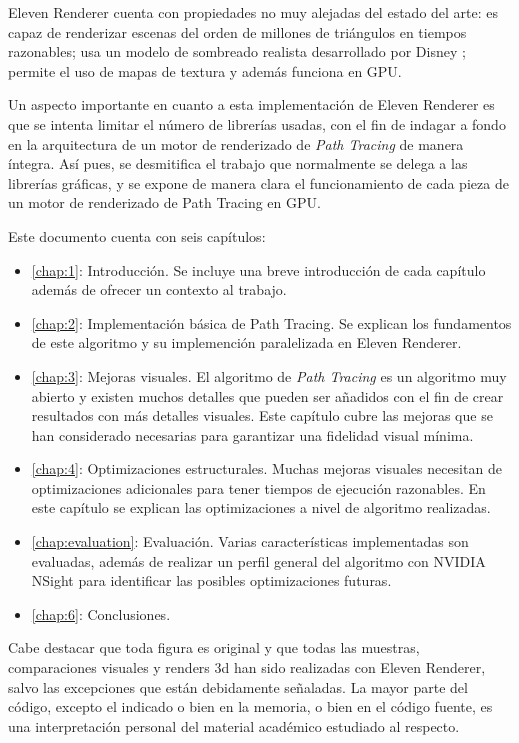 Eleven Renderer cuenta con propiedades no muy alejadas del estado del arte: es capaz de renderizar escenas del orden de millones de triángulos en tiempos razonables; usa un modelo de sombreado realista desarrollado por Disney \cite{burley2012physically}; permite el uso de mapas de textura y además funciona en GPU.

Un aspecto importante en cuanto a esta implementación de Eleven Renderer es que se intenta limitar el número de librerías usadas, con el fin de indagar a fondo en la arquitectura de un motor de renderizado de \emph{Path Tracing} de manera íntegra. Así pues, se desmitifica el trabajo que normalmente se delega a las librerías gráficas, y se expone de manera clara el funcionamiento de cada pieza de un motor de renderizado de Path Tracing en GPU.

Este documento cuenta con seis capítulos:

\begin{itemize}
	\item \autoref{chap:1}: Introducción. Se incluye una breve introducción de cada capítulo además de ofrecer un contexto al trabajo.
	\item \autoref{chap:2}: Implementación básica de Path Tracing. Se explican los fundamentos de este algoritmo y su implemención paralelizada en Eleven Renderer. 
	\item \autoref{chap:3}: Mejoras visuales. El algoritmo de \emph{Path Tracing} es un algoritmo muy abierto y existen muchos detalles que pueden ser añadidos con el fin de crear resultados con más detalles visuales. Este capítulo cubre las mejoras que se han considerado necesarias para garantizar una fidelidad visual mínima.
	\item \autoref{chap:4}: Optimizaciones estructurales. Muchas mejoras visuales necesitan de optimizaciones adicionales para tener tiempos de ejecución razonables. En este capítulo se explican las optimizaciones a nivel de algoritmo realizadas.
	\item \autoref{chap:evaluation}: Evaluación. Varias características implementadas son evaluadas, además de realizar un perfil general del algoritmo con NVIDIA NSight para identificar las posibles optimizaciones futuras.
	\item \autoref{chap:6}: Conclusiones. 
\end{itemize}

Cabe destacar que toda figura es original y que todas las muestras, comparaciones visuales y renders 3d han sido realizadas con Eleven Renderer, salvo las excepciones que están debidamente señaladas. La mayor parte del código, excepto el indicado o bien en la memoria, o bien en el código fuente, es una interpretación personal del material académico estudiado al respecto.

